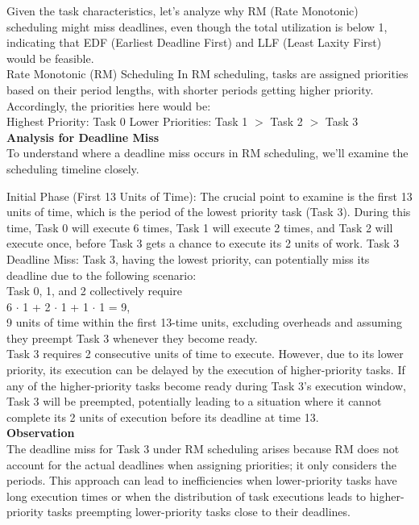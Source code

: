 \documentclass[a4paper,11pt]{article}%
\newenvironment{qanda}{\setlength{\parindent}{0pt}}{\bigskip}
\begin{document}
\begin{qanda}
\begin{enumerate}
\begin{enumerate}
				      Given the task characteristics, let's analyze why RM (Rate Monotonic) scheduling might miss deadlines, even though the total utilization is below 1, indicating that EDF (Earliest Deadline First) and LLF (Least Laxity First) would be feasible.\\

				      Rate Monotonic (RM) Scheduling
				      In RM scheduling, tasks are assigned priorities based on their period lengths, with shorter periods getting higher priority. Accordingly, the priorities here would be:\\

				      Highest Priority: Task 0
				      Lower Priorities: Task 1 $>$ Task 2 $>$ Task 3\\

				      \textbf{Analysis for Deadline Miss}\\
				      To understand where a deadline miss occurs in RM scheduling, we'll examine the scheduling timeline closely.

				      Initial Phase (First 13 Units of Time): The crucial point to examine is the first 13 units of time, which is the period of the lowest priority task (Task 3). During this time, Task 0 will execute 6 times, Task 1 will execute 2 times, and Task 2 will execute once, before Task 3 gets a chance to execute its 2 units of work.
				      Task 3 Deadline Miss: Task 3, having the lowest priority, can potentially miss its deadline due to the following scenario:\\
				      Task 0, 1, and 2 collectively require\\
				      6 $\cdot$ 1 + 2 $\cdot$ 1 + 1 $\cdot$ 1 = 9,\\
				      9 units of time within the first 13-time units, excluding overheads and assuming they preempt Task 3 whenever they become ready.\\

				      Task 3 requires 2 consecutive units of time to execute. However, due to its lower priority, its execution can be delayed by the execution of higher-priority tasks. If any of the higher-priority tasks become ready during Task 3's execution window, Task 3 will be preempted, potentially leading to a situation where it cannot complete its 2 units of execution before its deadline at time 13.\\

				      \textbf{Observation}\\
				      The deadline miss for Task 3 under RM scheduling arises because RM does not account for the actual deadlines when assigning priorities; it only considers the periods. This approach can lead to inefficiencies when lower-priority tasks have long execution times or when the distribution of task executions leads to higher-priority tasks preempting lower-priority tasks close to their deadlines.\\


\end{enumerate}
\end{enumerate}
\end{qanda}
\end{document}
